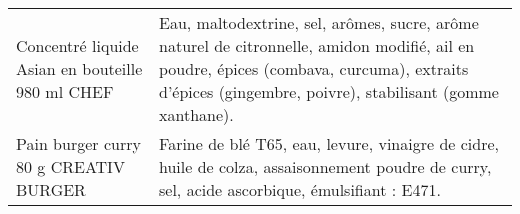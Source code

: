 \begin{longtable}{p{5cm}p{10cm}}
\bottomrule
\endlastfoot
                                                         Concentré liquide Asian en bouteille 980 ml CHEF &                                                                                                                                                                                                                                                                                                                                                                                                                                                                                                                                                                                                                                                                                                                                                                                                                                     Eau, maltodextrine, sel, arômes, sucre, arôme naturel de citronnelle, amidon modifié, ail en poudre, épices (combava, curcuma), extraits d'épices (gingembre, poivre), stabilisant (gomme xanthane). \\
                                                                    Pain burger curry 80 g CREATIV BURGER &                                                                                                                                                                                                                                                                                                                                                                                                                                                                                                                                                                                                                                                                                                                                                                                                                                                                                            Farine de blé T65, eau, levure, vinaigre de cidre, huile de colza, assaisonnement poudre de curry, sel, acide ascorbique, émulsifiant : E471. \\

\end{longtable}
